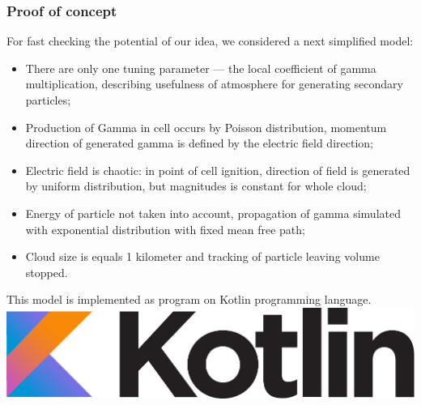 \documentclass[8pt,pdf,hyperref={unicode}]{beamer}
\begin{document}
\begin{frame}
    \frametitle{Proof of concept}
   	For fast checking the potential of our idea, we considered a next simplified model:  
    \begin{itemize}
    	\item There are only one tuning parameter  --- the local coefficient of gamma multiplication, describing usefulness of atmosphere for generating secondary particles;
    	\item Production of Gamma in cell occurs by Poisson distribution, momentum direction of generated gamma is defined by the electric field direction;
    	\item Electric field is chaotic: in point of cell ignition, direction of field is generated by uniform distribution, but magnitudes is constant for whole cloud;
    	\item Energy of particle not taken into account, propagation of gamma simulated with exponential distribution with fixed mean free path;
    	\item Cloud size is equals 1 kilometer and tracking of particle leaving volume stopped. 
    \end{itemize}
    This model is implemented as program on Kotlin programming language.
    \includegraphics[width=0.3\paperwidth]{kotlin.pdf}
    
    
\end{frame}
\end{document}
